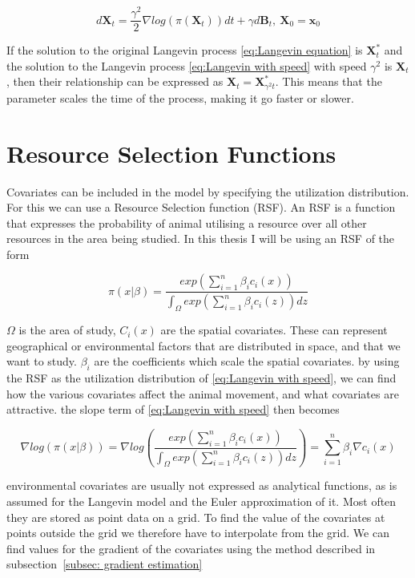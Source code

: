 \begin{equation}
    d\textbf{X}_t = \frac{\gamma^2}{2} \nabla log(\pi(\textbf{X}_t))dt + \gamma d\textbf{B}_t, \ \textbf{X}_0 = \textbf{x}_0
    \label{eq:Langevin with speed}
\end{equation}


If the solution to the original Langevin process \eqref{eq:Langevin equation} is $\textbf{X}^*_t$ and the solution to the Langevin process \eqref{eq:Langevin with speed} with speed $\gamma^2$ is $\textbf{X}_t$, then their relationship can be expressed as $\textbf{X}_t = \textbf{X}^*_{\gamma^2 t}$. This means that the parameter scales the time of the process, making it go faster or slower.


\section{Resource Selection Functions}

Covariates can be included in the model by specifying the utilization distribution. For this we can use a Resource Selection function (RSF). An RSF is a function that expresses the probability of animal utilising a resource over all other resources in the area being studied. In this thesis I will be using an RSF of the form


\begin{equation}
    \pi(x|\beta) = \frac{exp(\sum_{i=1}^n\beta_i c_i(x))}{\int_\Omega exp(\sum_{i=1}^n\beta_i c_i(z))dz}
    \label{eq: resource selection function}
\end{equation}

$\Omega$ is the area of study, $C_i(x)$ are the spatial covariates. These can represent geographical or environmental factors that are distributed in space, and that we want to study. $\beta_i$ are the coefficients which scale the spatial covariates. by using the RSF as the utilization distribution of \eqref{eq:Langevin with speed}, we can find how the various covariates affect the animal movement, and what covariates are attractive. the slope term of \eqref{eq:Langevin with speed} then becomes

\begin{equation}
    \nabla log(\pi(x|\beta)) = \nabla log(\frac{exp(\sum_{i=1}^n\beta_i c_i(x))}{\int_\Omega exp(\sum_{i=1}^n\beta_i c_i(z))dz}) =\sum_{i=1}^n \beta_i \nabla c_i(x)
\end{equation}



environmental covariates are usually not expressed as analytical functions, as is assumed for the Langevin model and the Euler approximation of it. Most often they are stored as point data on a grid. To find the value of the covariates at points outside the grid we therefore have to interpolate from the grid. We can find values for the gradient of the covariates using the method described in subsection~\ref{subsec: gradient estimation}


